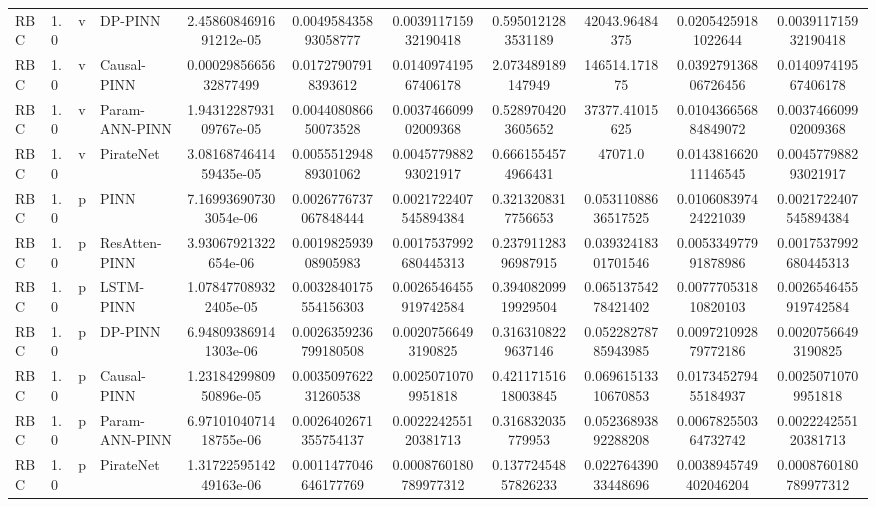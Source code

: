 \begin{landscape}
\begin{longtable}{llllccccccc}
 RBC &    1.0 &     v &        DP-PINN & 2.4586084691691212e-05 &   0.004958435893058777 &   0.003911715932190418 &   0.5950121283531189 &        42043.96484375 &   0.02054259181022644 &   0.003911715932190418 \\
 RBC &    1.0 &     v &    Causal-PINN &  0.0002985665632877499 &    0.01727907918393612 &   0.014097419567406178 &    2.073489189147949 &         146514.171875 &  0.039279136806726456 &   0.014097419567406178 \\
 RBC &    1.0 &     v & Param-ANN-PINN & 1.9431228793109767e-05 &   0.004408086650073528 &   0.003746609902009368 &   0.5289704203605652 &        37377.41015625 &  0.010436656884849072 &   0.003746609902009368 \\
 RBC &    1.0 &     v &      PirateNet & 3.0816874641459435e-05 &   0.005551294889301062 &   0.004577988293021917 &   0.6661554574966431 &               47071.0 &  0.014381662011146545 &   0.004577988293021917 \\
 RBC &    1.0 &     p &           PINN &  7.169936907303054e-06 &  0.0026776737067848444 &  0.0021722407545894384 &   0.3213208317756653 &   0.05311088636517525 &  0.010608397424221039 &  0.0021722407545894384 \\
 RBC &    1.0 &     p &  ResAtten-PINN &   3.93067921322654e-06 &   0.001982593908905983 &  0.0017537992680445313 &  0.23791128396987915 &   0.03932418301701546 &  0.005334977991878986 &  0.0017537992680445313 \\
 RBC &    1.0 &     p &      LSTM-PINN &  1.078477089322405e-05 &  0.0032840175554156303 &  0.0026546455919742584 &  0.39408209919929504 &   0.06513754278421402 &  0.007770531810820103 &  0.0026546455919742584 \\
 RBC &    1.0 &     p &        DP-PINN &  6.948093869141303e-06 &  0.0026359236799180508 &    0.00207566493190825 &   0.3163108229637146 &   0.05228278785943985 &  0.009721092879772186 &    0.00207566493190825 \\
 RBC &    1.0 &     p &    Causal-PINN & 1.2318429980950896e-05 &   0.003509762231260538 &    0.00250710709951818 &  0.42117151618003845 &   0.06961513310670853 &  0.017345279455184937 &    0.00250710709951818 \\
 RBC &    1.0 &     p & Param-ANN-PINN & 6.9710104071418755e-06 &  0.0026402671355754137 &   0.002224255120381713 &    0.316832035779953 &   0.05236893892288208 &  0.006782550364732742 &   0.002224255120381713 \\
 RBC &    1.0 &     p &      PirateNet & 1.3172259514249163e-06 &  0.0011477046646177769 &  0.0008760180789977312 &  0.13772454857826233 &   0.02276439033448696 & 0.0038945749402046204 &  0.0008760180789977312 \\

\end{longtable}
\end{landscape}
